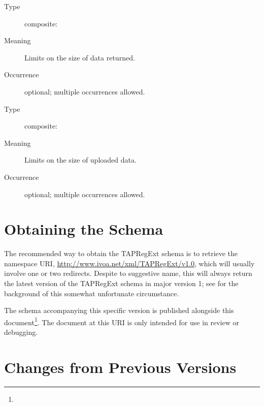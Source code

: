 \documentclass{ivoa}
\begin{document}
\begin{generated}
\begin{bigdescription}
\begin{description}
\end{description}
\item[Element \xmlel{outputLimit}]
\begin{description}
\item[Type] composite: 
\item[Meaning] Limits on the size of data returned.
\item[Occurrence] optional; multiple occurrences allowed.

\end{description}
\item[Element \xmlel{uploadLimit}]
\begin{description}
\item[Type] composite: 
\item[Meaning] Limits on the size of uploaded data.
\item[Occurrence] optional; multiple occurrences allowed.

\end{description}


\end{bigdescription}\endgroup

\endgroup
\end{generated}


\appendix


\section{Obtaining the Schema}

\label{app:fullschema}

The recommended way to obtain the TAPRegExt schema is to retrieve the
namespace URI, \url{http://www.ivoa.net/xml/TAPRegExt/v1.0}, which will
usually involve one or two redirects.  Despite to suggestive name, this
will always return the latest version of the TAPRegExt schema in major
version 1; see \citet{2018ivoa.spec.0529H} for the background of this
somewhat unfortunate circumstance.

The schema accompanying this specific version is published alongside this
document\footnote{}.  The document at
this URI is only intended for use in review or debugging.

\section{Changes from Previous Versions}
\end{document}
